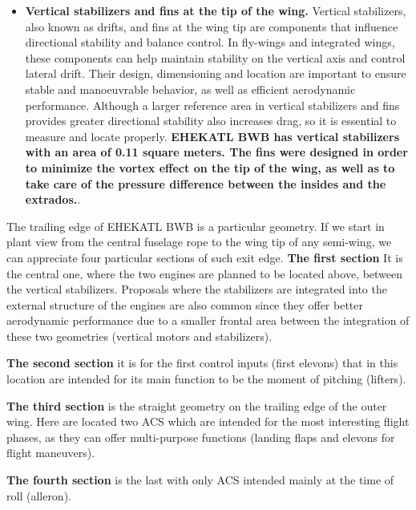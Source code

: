 \begin{itemize}
    \item \textbf{Vertical stabilizers and fins at the tip of the wing.} Vertical stabilizers, also known as drifts, and fins at the wing tip are components that influence directional stability and balance control. In fly-wings and integrated wings, these components can help maintain stability on the vertical axis and control lateral drift. Their design, dimensioning and location are important to ensure stable and manoeuvrable behavior, as well as efficient aerodynamic performance. Although a larger reference area in vertical stabilizers and fins provides greater directional stability also increases drag, so it is essential to measure and locate properly. \textbf{EHEKATL BWB has vertical stabilizers with an area of 0.11 square meters. The fins were designed in order to minimize the vortex effect on the tip of the wing, as well as to take care of the pressure difference between the insides and the extrados.}. 
\end{itemize}


The trailing edge of EHEKATL BWB is a particular geometry. If we start in plant view from the central fuselage rope to the wing tip of any semi-wing, we can appreciate four particular sections of such exit edge.
\textbf{The first section} It is the central one, where the two engines are planned to be located above, between the vertical stabilizers. Proposals where the stabilizers are integrated into the external structure of the engines are also common since they offer better aerodynamic performance due to a smaller frontal area between the integration of these two geometries (vertical motors and stabilizers).

\textbf{The second section} it is for the first control inputs (first elevons) that in this location are intended for its main function to be the moment of pitching (lifters).

\textbf{The third section} is the straight geometry on the trailing edge of the outer wing. Here are located two ACS which are intended for the most interesting flight phases, as they can offer multi-purpose functions (landing flaps and elevons for flight maneuvers). 

\textbf{The fourth section} is the last with only ACS intended mainly at the time of roll (alleron). 

